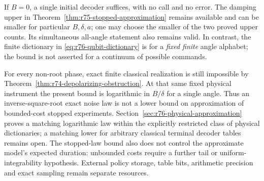 If $B=0$, a single initial decoder suffices, with no call and no error.
The damping upper in Theorem~\ref{thm:r75-stopped-approximation} remains
available and can be smaller for particular $B,\delta,a$; one may choose
the smaller of the two proved upper counts.  Its simultaneous
all-angle statement also remains valid.  In contrast, the finite dictionary
in \eqref{eq:r76-qubit-dictionary} is for a \emph{fixed finite} angle
alphabet; the bound is not asserted for a continuum of possible commands.

For every non-root phase, exact finite classical realization is still
impossible by Theorem~\ref{thm:r74-depolarizing-obstruction}.  At that same
fixed physical instrument the present bound is logarithmic in $B/\delta$
for a single angle.  Thus an inverse-square-root exact noise law is not a
lower bound on approximation of bounded-cost stopped experiments.
Section~\ref{sec:r76-physical-approximation} proves a matching logarithmic
law within the explicitly restricted class of physical dictionaries;
a matching lower for arbitrary classical terminal decoder tables remains
open.  The stopped-law bound also does not control the approximate
model's expected duration: unbounded costs
require a further tail or uniform-integrability hypothesis.  External
policy storage, table bits, arithmetic precision and exact sampling remain
separate resources.
